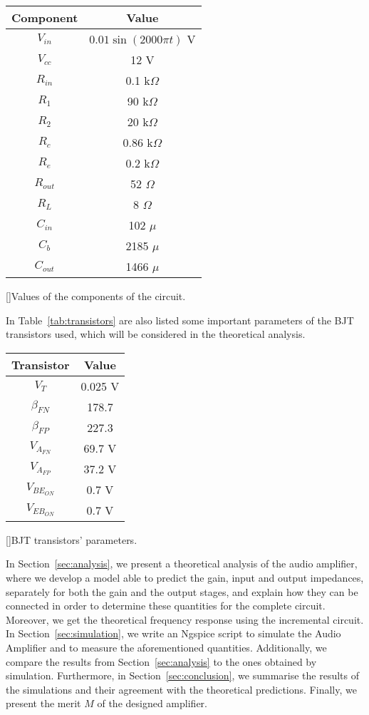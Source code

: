 \begin{center} 
\begin{tabular}{ | c | c | }
\hline
\textbf{Component} & \textbf{Value} \\
\hline
$V_{in}$ & $0.01\sin{(2000\pi t)}$ V \\
\hline
$V_{cc}$ & 12 V \\
\hline
$R_{in}$ & 0.1 k$\Omega$ \\
\hline
$R_1$ & 90 k$\Omega$ \\
\hline
$R_2$ & 20 k$\Omega$ \\
\hline
$R_c$ & 0.86 k$\Omega$ \\
\hline
$R_e$ & 0.2 k$\Omega$ \\
\hline
$R_{out}$ & 52 $\Omega$ \\
\hline
$R_L$ & 8 $\Omega$ \\
\hline
$C_{in}$ & 102 $\mu$ \\
\hline
$C_b$ & 2185 $\mu$ \\
\hline
$C_{out}$ & 1466 $\mu$ \\
\hline
\end{tabular}
[]{Values of the components of the circuit.}
\label{tab:components}
\end{center}

In Table~\ref{tab:transistors} are also listed some important parameters of the BJT transistors used, which will be considered in the theoretical analysis.

\begin{center}
\begin{tabular}{ | c | c | }
\hline
\textbf{Transistor} & \textbf{Value}\\
\hline
$V_T$ & 0.025 V \\
\hline
$\beta_{FN}$ & 178.7 \\
\hline
$\beta_{FP}$ & 227.3 \\
\hline
$V_{A_{FN}}$ & 69.7 V \\
\hline
$V_{A_{FP}}$ & 37.2 V \\
\hline
$V_{{BE}_{ON}}$ & 0.7 V \\
\hline
$V_{{EB}_{ON}}$ & 0.7 V \\
\hline
\end{tabular}
[]{BJT transistors' parameters.}
\label{tab:transistors}
\end{center}

In Section~\ref{sec:analysis}, we present a theoretical analysis of the audio amplifier, where we develop a model able to predict the gain, input and output impedances, separately for both the gain and the output stages, and explain how they can be connected in order to determine these quantities for the complete circuit. Moreover, we get the theoretical frequency response using the incremental circuit. In Section~\ref{sec:simulation}, we write an Ngspice script to simulate the Audio Amplifier and to measure the aforementioned quantities. Additionally, we compare the results from Section~\ref{sec:analysis} to the ones obtained by simulation. Furthermore, in Section~\ref{sec:conclusion}, we summarise the results of the simulations and their agreement with the theoretical predictions. Finally, we present the merit $M$ of the designed amplifier.

